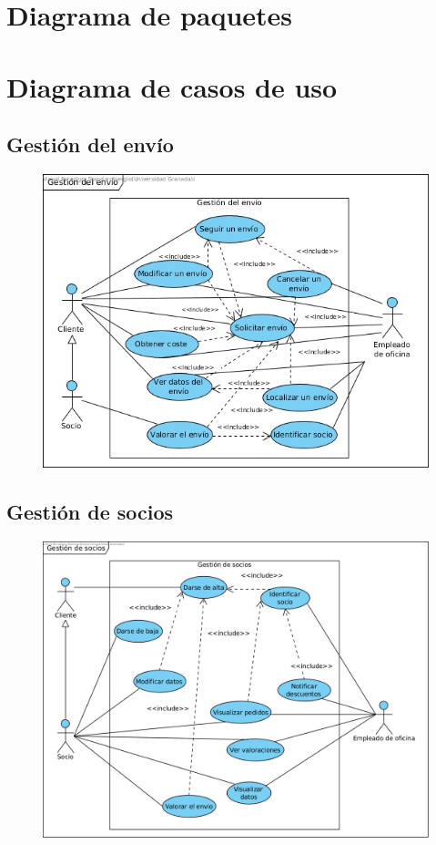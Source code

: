 \newpage

\section{Diagrama de paquetes}
\newpage


\section{Diagrama de casos de uso}
\subsection{Gestión del envío}
\begin{figure}[h]
	\centering
		\includegraphics[width=15cm]{diagr_envio}
\end{figure}

\newpage

\subsection{Gestión de socios}
\begin{figure}[h]
	\centering
	\includegraphics[width=15cm]{Gestion_socios.png}
\end{figure}


